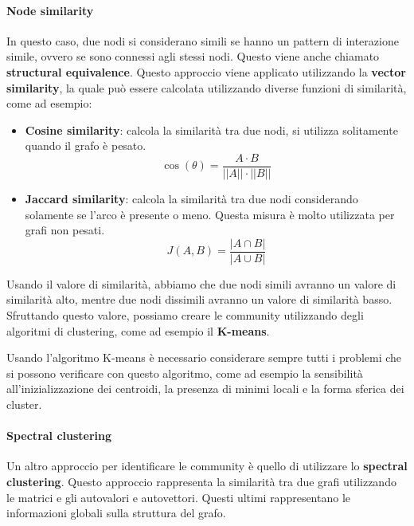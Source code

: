 \paragraph{Node similarity}
In questo caso, due nodi si considerano simili se hanno un pattern di interazione
simile, ovvero se sono connessi agli stessi nodi. Questo viene anche chiamato
\textbf{structural equivalence}. Questo approccio viene applicato utilizzando la
\textbf{vector similarity}, la quale può essere calcolata utilizzando diverse
funzioni di similarità, come ad esempio:
\begin{itemize}
    \item \textbf{Cosine similarity}: calcola la similarità tra due nodi, si
          utilizza solitamente quando il grafo è pesato.
          \begin{equation*}
              \cos(\theta) = \frac{A \cdot B}{||A|| \cdot ||B||}
          \end{equation*}
    \item \textbf{Jaccard similarity}: calcola la similarità tra due nodi
          considerando solamente se l'arco è presente o meno. Questa misura
          è molto utilizzata per grafi non pesati.
          \begin{equation*}
              J(A, B) = \frac{|A \cap B|}{|A \cup B|}
          \end{equation*}
\end{itemize}
Usando il valore di similarità, abbiamo che due nodi simili avranno un valore
di similarità alto, mentre due nodi dissimili avranno un valore di similarità
basso. Sfruttando questo valore, possiamo creare le community utilizzando
degli algoritmi di clustering, come ad esempio il \textbf{K-means}. 
\begin{nota}
    Usando l'algoritmo K-means è necessario considerare sempre tutti i problemi 
    che si possono verificare con questo algoritmo, come ad esempio la sensibilità
    all'inizializzazione dei centroidi, la presenza di minimi locali e la forma
    sferica dei cluster.
\end{nota}
\paragraph{Spectral clustering}
Un altro approccio per identificare le community è quello di utilizzare lo 
\textbf{spectral clustering}. Questo approccio rappresenta la similarità tra due 
grafi utilizzando le matrici e gli autovalori e autovettori. Questi ultimi 
rappresentano le informazioni globali sulla struttura del grafo.

